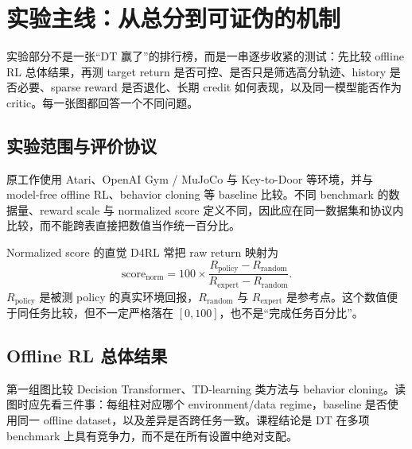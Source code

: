\section{实验主线：从总分到可证伪的机制}

实验部分不是一张“DT 赢了”的排行榜，而是一串逐步收紧的测试：先比较 offline RL 总体结果，再测 target return 是否可控、是否只是筛选高分轨迹、history 是否必要、sparse reward 是否退化、长期 credit 如何表现，以及同一模型能否作为 critic。每一张图都回答一个不同问题。

\subsection{实验范围与评价协议}

原工作使用 Atari、OpenAI Gym / MuJoCo 与 Key-to-Door 等环境，并与 model-free offline RL、behavior cloning 等 baseline 比较。不同 benchmark 的数据量、reward scale 与 normalized score 定义不同，因此应在同一数据集和协议内比较，而不能跨表直接把数值当作统一百分比。


\begin{knowledgebox}{Normalized score 的直觉}
D4RL 常把 raw return 映射为
\[
\mathrm{score}_{\mathrm{norm}}
=100\times\frac{R_{\mathrm{policy}}-R_{\mathrm{random}}}
{R_{\mathrm{expert}}-R_{\mathrm{random}}}.
\]
$R_{\mathrm{policy}}$ 是被测 policy 的真实环境回报，$R_{\mathrm{random}}$ 与 $R_{\mathrm{expert}}$ 是参考点。这个数值便于同任务比较，但不一定严格落在 $[0,100]$，也不是“完成任务百分比”。
\end{knowledgebox}

\subsection{Offline RL 总体结果}

第一组图比较 Decision Transformer、TD-learning 类方法与 behavior cloning。读图时应先看三件事：每组柱对应哪个 environment/data regime，baseline 是否使用同一 offline dataset，以及差异是否跨任务一致。课程结论是 DT 在多项 benchmark 上具有竞争力，而不是在所有设置中绝对支配。


